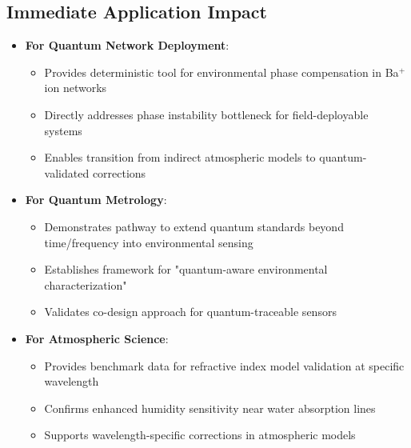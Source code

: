 \documentclass[aip,reprint,groupedaddress,onecolumn,superscriptaddress]{revtex4-2}
\begin{document}
\subsection{Immediate Application Impact}
\begin{itemize}
    \item \textbf{For Quantum Network Deployment}:
    \begin{itemize}
        \item Provides deterministic tool for environmental phase compensation in Ba$^+$ ion networks
        \item Directly addresses phase instability bottleneck for field-deployable systems
        \item Enables transition from indirect atmospheric models to quantum-validated corrections
    \end{itemize}
    
    \item \textbf{For Quantum Metrology}:
    \begin{itemize}
        \item Demonstrates pathway to extend quantum standards beyond time/frequency into environmental sensing
        \item Establishes framework for "quantum-aware environmental characterization"
        \item Validates co-design approach for quantum-traceable sensors
    \end{itemize}
    
    \item \textbf{For Atmospheric Science}:
    \begin{itemize}
        \item Provides benchmark data for refractive index model validation at specific wavelength
        \item Confirms enhanced humidity sensitivity near water absorption lines
        \item Supports wavelength-specific corrections in atmospheric models
    \end{itemize}
\end{itemize}
\end{document}
